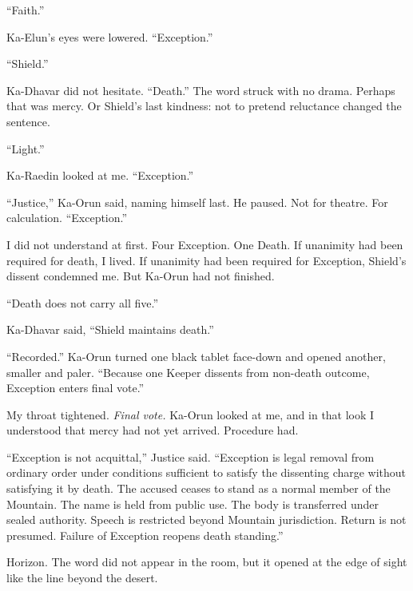 ``Faith.''\par

Ka-Elun's eyes were lowered. ``Exception.''\par

``Shield.''\par

Ka-Dhavar did not hesitate. ``Death.'' The word struck with no drama. Perhaps that was mercy. Or Shield's last kindness: not to pretend reluctance changed the sentence.\par

``Light.''\par

Ka-Raedin looked at me. ``Exception.''\par

``Justice,'' Ka-Orun said, naming himself last. He paused. Not for theatre. For calculation. ``Exception.''\par

I did not understand at first. Four Exception. One Death. If unanimity had been required for death, I lived. If unanimity had been required for Exception, Shield's dissent condemned me. But Ka-Orun had not finished.\par

``Death does not carry all five.''\par

Ka-Dhavar said, ``Shield maintains death.''\par

``Recorded.'' Ka-Orun turned one black tablet face-down and opened another, smaller and paler. ``Because one Keeper dissents from non-death outcome, Exception enters final vote.''\par

My throat tightened. \emph{Final vote.} Ka-Orun looked at me, and in that look I understood that mercy had not yet arrived. Procedure had.\par

``Exception is not acquittal,'' Justice said. ``Exception is legal removal from ordinary order under conditions sufficient to satisfy the dissenting charge without satisfying it by death. The accused ceases to stand as a normal member of the Mountain. The name is held from public use. The body is transferred under sealed authority. Speech is restricted beyond Mountain jurisdiction. Return is not presumed. Failure of Exception reopens death standing.''\par

Horizon. The word did not appear in the room, but it opened at the edge of sight like the line beyond the desert.\par

